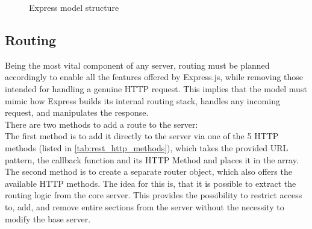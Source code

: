 \begin{figure}[h]
\begin{adjustbox}{width=\textwidth}
    \end{adjustbox}
    \caption{Express model structure}
    \label{fig:express-struc}
\end{figure}


\subsection{Routing} 
\label{sec:routing}
Being the most vital component of any server, routing must be planned accordingly to enable all the features offered by Express.js, while removing those intended for handling a genuine HTTP request. This implies that the model must mimic how Express builds its internal routing stack, handles any incoming request, and manipulates the response.\\
There are two methods to add a route to the server:\\ 
The first method is to add it directly to the server via one of the 5 HTTP methods (listed in \autoref{tab:rest_http_methods}), which takes the provided URL pattern, the callback function and its HTTP Method and places it in the array.\\
The second method is to create a separate router object, which also offers the available HTTP methods. The idea for this is, that it is possible to extract the routing logic from the core server. This provides the possibility to restrict access to, add, and remove entire sections from the server without the necessity to modify the base server.\\


